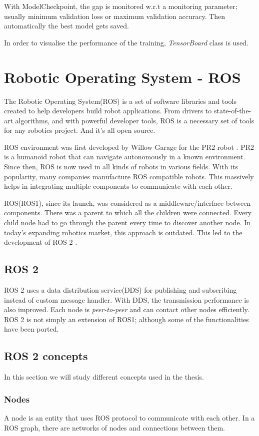 With ModelCheckpoint, the gap is monitored w.r.t a monitoring parameter; usually minimum validation
loss or maximum validation accuracy. Then automatically the best model gets saved.

In order to visualise the performance of the training, \textit{TensorBoard} class is used.

\section{Robotic Operating System - ROS}
The Robotic Operating System(ROS) \cite{aboutros} is a set of software libraries and tools created to help
developers build robot applications. From drivers to state-of-the-art algorithms, and with powerful developer tools, ROS is a necessary set of tools for any robotics project. And it’s all open source.

ROS environment was first developed by Willow Garage for the PR2 robot \cite{firstros}. PR2 is a humanoid robot that can navigate autonomously in a known environment.
Since then, ROS is now used in all kinds of robots in various fields. With its popularity,
many companies manufacture ROS compatible robots. This massively helps in integrating
multiple components to communicate with each other.

ROS(ROS1), since its launch, was considered as a middleware/interface between components. There was a
parent to which all the children were connected. Every child node had to go through the
parent every time to discover another node.  In today's expanding robotics market,
this approach is outdated. This led to the development of ROS 2 \cite{whyros2}.
\subsection{ROS 2}
ROS 2 uses a data distribution service(DDS) for publishing and subscribing instead of
custom message handler. With DDS, the transmission performance is also improved. Each node
is \textit{peer-to-peer} and can contact other nodes efficiently.
ROS 2 is not simply an extension of ROS1; although some of the functionalities have been
ported.


\subsection{ROS 2 concepts}
In this section we will study different concepts used in the thesis.
\subsubsection*{Nodes}
A node is an entity that uses ROS protocol to communicate with each other. In a ROS graph,
there are networks of nodes and connections between them.
